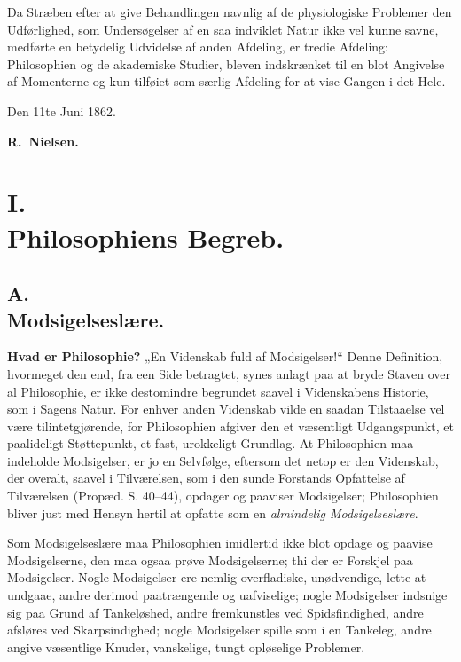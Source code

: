 \documentclass[12pt,a4paper]{book}
\begin{document}
Da Stræben efter at give Behandlingen navnlig af de physiologiske
Problemer den Udførlighed, som Undersøgelser af en saa indviklet Natur
ikke vel kunne savne, medførte en betydelig Udvidelse af anden
Afdeling, er tredie Afdeling: Philosophien og de akademiske Studier,
bleven indskrænket til en blot Angivelse af Momenterne og kun tilføiet
som særlig Afdeling for at vise Gangen i det Hele.

\noindent Den 11te Juni 1862.

\begin{flushright}
\textbf{R.~Nielsen.}
\end{flushright}


\chapter*{I.\\ Philosophiens Begreb.}

\section*{A.\\ Modsigelseslære.}

\textbf{Hvad er Philosophie?} „En Videnskab fuld af Modsigelser!“
Denne Definition, hvormeget den end, fra een Side betragtet, synes
anlagt paa at bryde Staven over al Philosophie, er ikke destomindre
begrundet saavel i Videnskabens Historie, som i Sagens Natur. For
enhver anden Videnskab vilde en saadan Tilstaaelse vel være
tilintetgjørende, for Philosophien afgiver den et væsentligt
Udgangspunkt, et paalideligt Støttepunkt, et fast, urokkeligt
Grundlag. At Philosophien maa indeholde Modsigelser, er jo en
Selvfølge, eftersom det netop er den Videnskab, der overalt, saavel i
Tilværelsen, som i den sunde Forstands Opfattelse af Tilværelsen
(Propæd. S. 40--44), opdager og paaviser Modsigelser; Philosophien
bliver just med Hensyn hertil at opfatte som en \emph{almindelig
Modsigelseslære}.

Som Modsigelseslære maa Philosophien imidlertid ikke blot opdage og
paavise Modsigelserne, den maa ogsaa prøve Modsigelserne; thi der er
Forskjel paa Modsigelser. Nogle Modsigelser ere nemlig overfladiske,
unødvendige, lette at undgaae, andre derimod paatrængende og
uafviselige; nogle Modsigelser indsnige sig paa Grund af Tankeløshed,
andre
fremkunstles ved Spidsfindighed, andre afsløres ved Skarpsindighed;
nogle Modsigelser spille som i en Tankeleg, andre angive væsentlige
Knuder, vanskelige, tungt opløselige Problemer.
\end{document}
